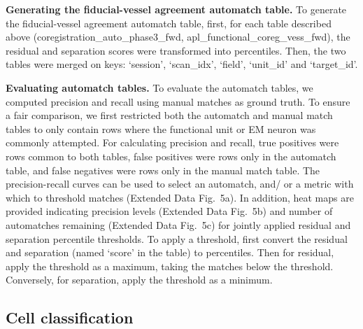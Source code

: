 \documentclass{article}
\begin{document}
\textbf{Generating the fiducial-vessel agreement automatch table.} To generate the fiducial-vessel agreement automatch table, first, for each table described above (coregistration\_auto\_phase3\_fwd, apl\_functional\_coreg\_vess\_fwd), the residual and separation scores were transformed into percentiles. Then, the two tables were merged on keys: ‘session’, ‘scan\_idx’, ‘field’, ‘unit\_id’ and ‘target\_id’.

\textbf{Evaluating automatch tables.} To evaluate the automatch tables, we computed precision and recall using manual matches as ground truth. To ensure a fair comparison, we first restricted both the automatch and manual match tables to only contain rows where the functional unit or EM neuron was commonly attempted. For calculating precision and recall, true positives were rows common to both tables, false positives were rows only in the automatch table, and false negatives were rows only in the manual match table. The precision-recall curves can be used to select an automatch, and/ or a metric with which to threshold matches (Extended Data Fig.~5a). In addition, heat maps are provided indicating precision levels (Extended Data Fig.~5b) and number of automatches remaining (Extended Data Fig.~5c) for jointly applied residual and separation percentile thresholds. To apply a threshold, first convert the residual and separation (named ‘score’ in the table) to percentiles. Then for residual, apply the threshold as a maximum, taking the matches below the threshold. Conversely, for separation, apply the threshold as a minimum.

\subsection*{Cell classification}
\end{document}
